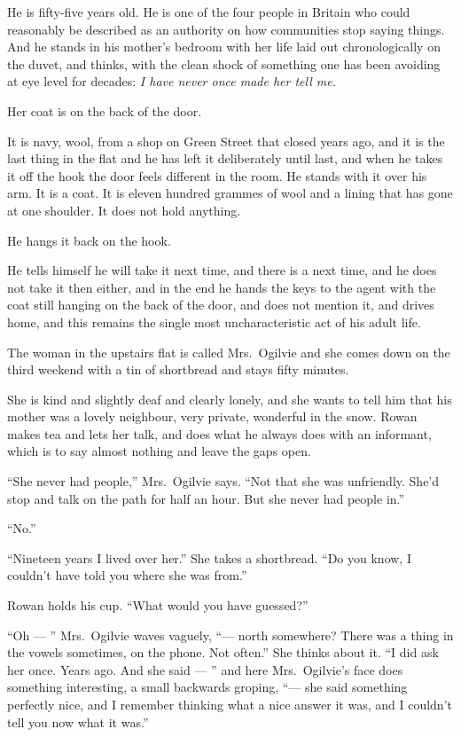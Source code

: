 \documentclass[11pt,oneside]{book}
\newcommand{\sceneline}{%
  \par\vspace{1.2em}
  \begin{center}
    \fontsize{11}{11}\selectfont \textbullet\quad\textbullet\quad\textbullet
  \end{center}
  \vspace{0.6em}\noindent\ignorespaces
}
\begin{document}
He is fifty-five years old. He is one of the four people in Britain who
could reasonably be described as an authority on how communities stop
saying things. And he stands in his mother's bedroom with her life laid
out chronologically on the duvet, and thinks, with the clean shock of
something one has been avoiding at eye level for decades: \emph{I have
never once made her tell me.}

\sceneline

Her coat is on the back of the door.

It is navy, wool, from a shop on Green Street that closed years ago, and
it is the last thing in the flat and he has left it deliberately until
last, and when he takes it off the hook the door feels different in the
room. He stands with it over his arm. It is a coat. It is eleven hundred
grammes of wool and a lining that has gone at one shoulder. It does not
hold anything.

He hangs it back on the hook.

He tells himself he will take it next time, and there is a next time,
and he does not take it then either, and in the end he hands the keys to
the agent with the coat still hanging on the back of the door, and does
not mention it, and drives home, and this remains the single most
uncharacteristic act of his adult life.

\sceneline

The woman in the upstairs flat is called Mrs.~Ogilvie and she comes down
on the third weekend with a tin of shortbread and stays fifty minutes.

She is kind and slightly deaf and clearly lonely, and she wants to tell
him that his mother was a lovely neighbour, very private, wonderful in
the snow. Rowan makes tea and lets her talk, and does what he always
does with an informant, which is to say almost nothing and leave the
gaps open.

``She never had people,'' Mrs.~Ogilvie says. ``Not that she was
unfriendly. She'd stop and talk on the path for half an hour. But she
never had people in.''

``No.''

``Nineteen years I lived over her.'' She takes a shortbread. ``Do you
know, I couldn't have told you where she was from.''

Rowan holds his cup. ``What would you have guessed?''

``Oh --- '' Mrs.~Ogilvie waves vaguely, ``--- north somewhere? There was
a thing in the vowels sometimes, on the phone. Not often.'' She thinks
about it. ``I did ask her once. Years ago. And she said --- '' and here
Mrs.~Ogilvie's face does something interesting, a small backwards
groping, ``--- she said something perfectly nice, and I remember thinking
what a nice answer it was, and I couldn't tell you now what it was.''
\end{document}

